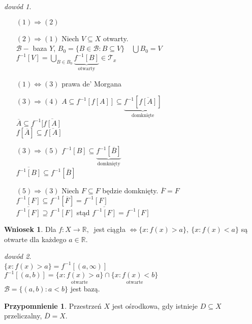 \documentclass[twoside,10pt]{article}
\theoremstyle{definition}
\theoremstyle{definition}
\theoremstyle{definition}
\theoremstyle{definition}
\theoremstyle{remark}
\newtheorem*{dd}{dowód}
\theoremstyle{definition}
\theoremstyle{definition}
\newtheorem*{wn}{Wniosek}
\theoremstyle{definition}
\theoremstyle{definition}
\theoremstyle{definition}
\theoremstyle{definition}
\newtheorem*{przyp}{Przypomnienie}
\begin{document}
\begin{dd} \hfill
    \begin{itemize} 
        \item[$(1) \Rightarrow (2)$] 
        \item[$(2) \Rightarrow (1)$] Niech $V \subseteq X$ otwarty. \\ 
            $\mathcal B -$ baza $Y$, $B_0 = \{ B \in \mathcal B : B \subseteq V \} \quad \bigcup B_0 = V$ \\ 
            $f^{-1} [V] = \bigcup\limits_{B \in B_0} \underbrace{f^{-1} [B]}_{\text{otwarty}} \in \mathcal T_x$
        \item[$(1) \Leftrightarrow (3)$] prawa de' Morgana
        \item[$(3) \Rightarrow (4)$] $A \subseteq f^{-1} [f[A]] \subseteq \underbrace{f^{-1}[\overline{f[A]}]}_{\text{domknięte}}$ \\
            $\overline A \subseteq f^{-1}[ \overline{f[A]}$ \\ 
            $f[\overline A] \subseteq \overline{ f[A]}$
        \item[$(3) \Rightarrow (5)$] $f^{-1}[B] \subseteq \underbrace{f^{-1}[\overline B]}_{\text{domknięty}}$ \\ 
            $\overline{ f^{-1}[B]} \subseteq f^{-1}[\overline B]$
        \item[$(5) \Rightarrow (3)$] Niech $F \subseteq F$ będzie domknięty. $\overline F = F$ \\ 
            $f^{-1}[F] \subseteq f^{-1}[\overline F] = f^{-1}[F]$ \\ 
            $\overline{f^{-1}[F]} \supseteq f^{-1}[F]$ stąd $\overline{f^{-1}[F]} = f^{-1}[F]$
    \end{itemize} 
\end{dd} 
\begin{wn} 
    Dla $f: X \to \mathbb R,\ $ jest ciągła $\Leftrightarrow \{x: f(x) > a\},\ \{x: f(x) < a\}$ są 
    otwarte dla każdego $a \in \mathbb R$.
\end{wn} 
\begin{dd} ~\\ 
    $\{x : f(x) > a\} = f^{-1}[(a,\infty)]$\\
    $f^{-1}[(a,b)] = \underset{\text{otwarte}}{\{x : f(x) > a\}} \cap \underset{\text{otwarte}}{\{x : f(x) < b\}}$ \\ 
    $\mathcal B = \{(a,b): a < b\}$ jest bazą.
\end{dd} 
\begin{przyp} Przestrzeń $X$ jest ośrodkowa, gdy istnieje $D \subseteq X$ przeliczalny, $\overline D = X$. 
    \end{przyp} 
\end{document}
